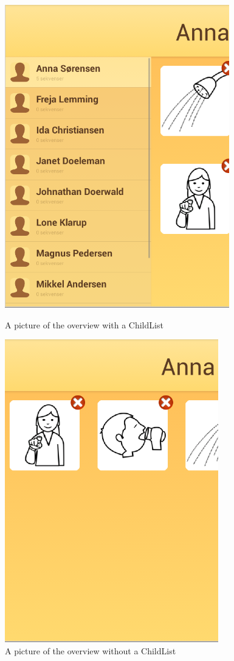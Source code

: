 \begin{figure}[ht!]
\centering
\begin{minipage}{.45\textwidth}
\centering
\includegraphics[scale=0.9]{Pics/Sprint2/childlists/withList.png}
\caption{A picture of the overview with a ChildList}
\label{fig:withList}
\end{minipage}\hfill
\begin{minipage}{.45\textwidth}
\centering
\includegraphics[scale=0.9]{Pics/Sprint2/childlists/withoutList.png}
\caption{A picture of the overview without a ChildList}
\label{fig:withoutList}
\end{minipage}
\end{figure}


